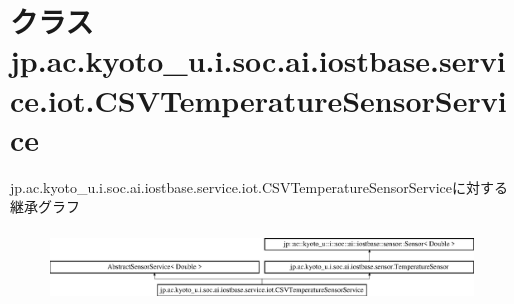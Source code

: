 \hypertarget{classjp_1_1ac_1_1kyoto__u_1_1i_1_1soc_1_1ai_1_1iostbase_1_1service_1_1iot_1_1_c_s_v_temperature_sensor_service}{\section{クラス jp.\-ac.\-kyoto\-\_\-u.\-i.\-soc.\-ai.\-iostbase.\-service.\-iot.\-C\-S\-V\-Temperature\-Sensor\-Service}
\label{classjp_1_1ac_1_1kyoto__u_1_1i_1_1soc_1_1ai_1_1iostbase_1_1service_1_1iot_1_1_c_s_v_temperature_sensor_service}
}
jp.\-ac.\-kyoto\-\_\-u.\-i.\-soc.\-ai.\-iostbase.\-service.\-iot.\-C\-S\-V\-Temperature\-Sensor\-Serviceに対する継承グラフ\begin{figure}[H]
\begin{center}
\leavevmode
\includegraphics[height=1.913440cm]{classjp_1_1ac_1_1kyoto__u_1_1i_1_1soc_1_1ai_1_1iostbase_1_1service_1_1iot_1_1_c_s_v_temperature_sensor_service}
\end{center}
\end{figure}
